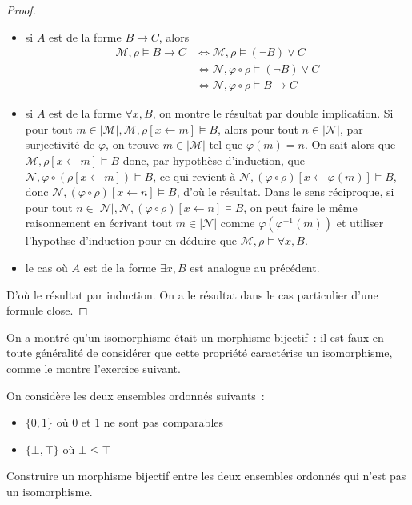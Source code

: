 \begin{proof}
\begin{itemize}
  \item si $A$ est de la forme $B\to C$, alors
    \begin{align*}
      \mathcal M,\rho\models B\to C &\iff
      \mathcal M,\rho\models (\lnot B)\lor C\\
      &\iff \mathcal N,\varphi\circ\rho\models (\lnot B) \lor C\\
      &\iff \mathcal N,\varphi\circ\rho\models B \to C
    \end{align*}
  \item si $A$ est de la forme $\forall x,B$, on montre le résultat par double
    implication. Si pour tout
    $m \in |\mathcal M|, \mathcal M,\rho[x\leftarrow m]\models B$, alors
    pour tout $n \in |\mathcal N|$, par surjectivité de $\varphi$, on trouve
    $m \in |\mathcal M|$ tel que $\varphi(m) = n$. On sait alors que
    $\mathcal M,\rho[x\leftarrow m]\models B$ donc, par hypothèse d'induction,
    que $\mathcal N,\varphi\circ(\rho[x\leftarrow m])\models B$, ce qui revient
    à $\mathcal N,(\varphi\circ\rho)[x\leftarrow \varphi(m)]\models B$, donc
    $\mathcal N,(\varphi\circ\rho)[x\leftarrow n]\models B$, d'où le résultat.
    Dans le sens réciproque, si pour tout
    $n\in|\mathcal N|, \mathcal N,(\varphi\circ\rho)[x\leftarrow n]\models B$,
    on peut faire le même raisonnement en écrivant tout $m \in |\mathcal N|$
    comme $\varphi(\varphi^{-1}(m))$ et utiliser l'hypothse d'induction pour en
    déduire que $\mathcal M,\rho\models \forall x,B$.
  \item le cas où $A$ est de la forme $\exists x, B$ est analogue au précédent.
  \end{itemize}
  D'où le résultat par induction. On a le résultat dans le cas particulier d'une
  formule close.
\end{proof}

On a montré qu'un isomorphisme était un morphisme bijectif~: il est faux en
toute généralité de considérer que cette propriété caractérise un isomorphisme,
comme le montre l'exercice suivant.

\begin{exercise}
  On considère les deux ensembles ordonnés suivants~:
  \begin{itemize}
  \item $\{0,1\}$ où $0$ et $1$ ne sont pas comparables
  \item $\{\bot,\top\}$ où $\bot \leq \top$
  \end{itemize}
  Construire un morphisme bijectif entre les deux ensembles ordonnés qui n'est
  pas un isomorphisme.
\end{exercise}

